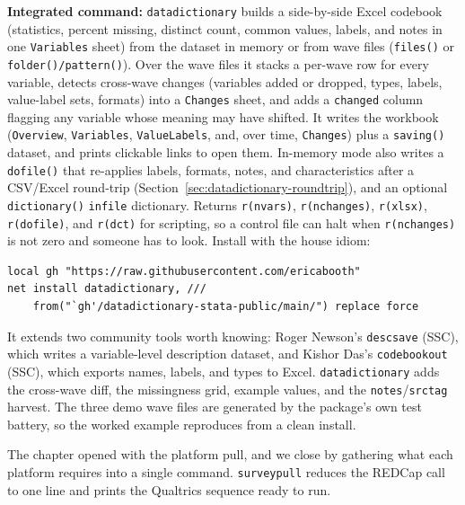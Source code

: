 \documentclass[
    a4paper,
    fontsize=10pt,
    twoside=true,
    numbers=noenddot,
]{kaobook}
\begin{document}
\begin{kaobox}[frametitle=Package Integration: \texttt{datadictionary}]
\textbf{Integrated command:} \texttt{datadictionary} builds a side-by-side Excel codebook (statistics, percent missing, distinct count, common values, labels, and notes in one \texttt{Variables} sheet) from the dataset in memory or from wave files (\texttt{files()} or \texttt{folder()/pattern()}). Over the wave files it stacks a per-wave row for every variable, detects cross-wave changes (variables added or dropped, types, labels, value-label sets, formats) into a \texttt{Changes} sheet, and adds a \texttt{changed} column flagging any variable whose meaning may have shifted. It writes the workbook (\texttt{Overview}, \texttt{Variables}, \texttt{ValueLabels}, and, over time, \texttt{Changes}) plus a \texttt{saving()} dataset, and prints clickable links to open them. In-memory mode also writes a \texttt{dofile()} that re-applies labels, formats, notes, and characteristics after a CSV/Excel round-trip (Section~\ref{sec:datadictionary-roundtrip}), and an optional \texttt{dictionary()} \texttt{infile} dictionary. Returns \texttt{r(nvars)}, \texttt{r(nchanges)}, \texttt{r(xlsx)}, \texttt{r(dofile)}, and \texttt{r(dct)} for scripting, so a control file can halt when \texttt{r(nchanges)} is not zero and someone has to look. Install with the house idiom:
\par
{\footnotesize
\begin{verbatim}
local gh "https://raw.githubusercontent.com/ericabooth"
net install datadictionary, ///
    from("`gh'/datadictionary-stata-public/main/") replace force
\end{verbatim}
}
It extends two community tools worth knowing: Roger Newson's \texttt{descsave} (SSC), which writes a variable-level description dataset, and Kishor Das's \texttt{codebookout} (SSC), which exports names, labels, and types to Excel. \texttt{datadictionary} adds the cross-wave diff, the missingness grid, example values, and the \texttt{notes}/\texttt{srctag} harvest. The three demo wave files are generated by the package's own test battery, so the worked example reproduces from a clean install.
\end{kaobox}

The chapter opened with the platform pull, and we close by gathering what each platform requires into a single command. \texttt{surveypull} reduces the REDCap call to one line and prints the Qualtrics sequence ready to run.
\end{document}
